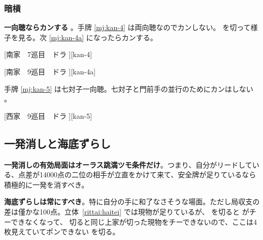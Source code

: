 \documentclass[../nankiru_main.tex]{subfiles}
\begin{document}
\subsubsection*{暗槓}

\textbf{一向聴ならカンする} \citep[][pp.153--157]{ooi-gundou}。手牌 \ref{mj:kan-4} は両向聴なのでカンしない。 を切って様子を見る。次 \ref{mj:kan-4a} になったらカンする。

[南家　7巡目　ドラ ][kan-4]

[南家　9巡目　ドラ ][kan-4a]

手牌 \ref{mj:kan-5} は七対子一向聴。七対子と門前手の並行のためにカンはしない \citep[][pp.~163--164]{ooi-gundou}。

[西家　9巡目　ドラ ][kan-5]


\subsection{一発消しと海底ずらし}

\textbf{一発消しの有効局面はオーラス跳満ツモ条件だけ}\citep[][p.~188]{hirasawa-naki}。つまり、自分がリードしている、点差が14000点の二位の相手が立直をかけて来て、安全牌が足りているなら積極的に一発を消すべき。

\textbf{海底ずらしは常にすべき}\citep[][p.~190]{hirasawa-naki}。特に自分の手に和了なさそうな場面。ただし局収支の差は僅かな100点\citep[][p. 188]{miinin-choice}。立体~\ref{rittai:haitei} では現物が足りているが、 を切ると  がチーできなくなって、 切ると同じ上家が切った現物をチーできないので、ここは4枚見えていてポンできない  を切る。

\begin{rittai}[h]
  \centering
  
  
  \caption{海底ずらしの場合}
  \label{rittai:haitei}
\end{rittai}
\end{document}
